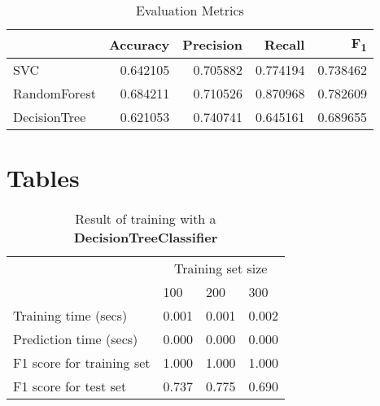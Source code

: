 \documentclass[12pt]{article}
\begin{document}
\setlength{\extrarowheight}{1.5pt}
\begin{table}[!htbp]
\caption{Evaluation Metrics} %
\centering %
\begin{tabular}{|l|r|r|r|r|} %
\hline %
& Accuracy & Precision & Recall & F\textsubscript{1}\\[0.5ex]
\hline %
SVC           & 0.642105   & 0.705882  & 0.774194  & 0.738462\\
RandomForest  & 0.684211   & 0.710526  & 0.870968  & 0.782609\\
DecisionTree  & 0.621053   & 0.740741  & 0.645161  & 0.689655\\
\hline %
\end{tabular}
\label{scoresTable}
\end{table}






\section*{Tables}

\setlength{\extrarowheight}{1.5pt}
\begin{table}[!htbp]
\caption{Result of training with a \textbf{DecisionTreeClassifier}} %
\centering %
\begin{tabular}{|p{6cm}|p{1.5cm}|p{1.5cm}|p{1.5cm}|} %
\hline %
& \multicolumn{3}{c|}{Training set size}\\[5pt]
\cline{2-4} 
& 100 & 200 & 300\\[0.5ex]
\hline %

Training time (secs)   &       0.001 & 0.001 & 0.002 \\
Prediction time (secs)   &     0.000 & 0.000 & 0.000 \\
F1 score for training set  &   1.000 & 1.000 & 1.000 \\
F1 score for test set    &     0.737 & 0.775 & 0.690 \\
\hline %
\end{tabular}
\label{decisionTreeTable}
\end{table}
\end{document}
